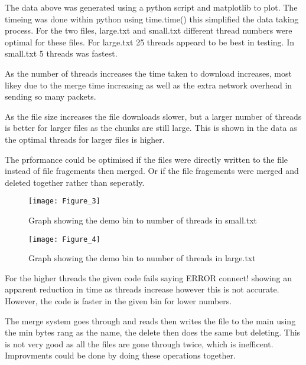 \documentclass[12pt]{article}
\begin{document}
The data above was generated using a python script and matplotlib to plot. The timeing was done within python using time.time() this simplified the data taking process. For the two files, large.txt and small.txt different thread numbers were optimal for these files. For large.txt 25 threads appeard to be best in testing. In small.txt 5 threads was fastest.

As the number of threads increases the time taken to download increases, most likey due to the merge time increasing as well as the extra network overhead in sending so many packets. 

As the file size increases the file downloads slower, but a larger number of threads is better for larger files as the chunks are still large. This is shown in the data as the optimal threads for larger files is higher.

The prformance could be optimised if the files were directly written to the file instead of file fragements then merged. Or if the file fragements were merged and deleted together rather than seperatly.

\begin{figure}[H]
\texttt{[image: Figure\_3]}
\caption{Graph showing the demo bin to number of threads in small.txt}
\end{figure}

\begin{figure}[H]
\texttt{[image: Figure\_4]}
\caption{Graph showing the demo bin to number of threads in large.txt}
\end{figure}

For the higher threads the given code fails saying ERROR connect! showing an apparent reduction in time as threads increase however this is not accurate. However, the code is faster in the given bin for lower numbers. 

The merge system goes through and reads then writes the file to the main using the min bytes rang as the name, the delete then does the same but deleting. This is not very good as all the files are gone through twice, which is inefficent. Improvments could be done by doing these operations together.
\end{document}
